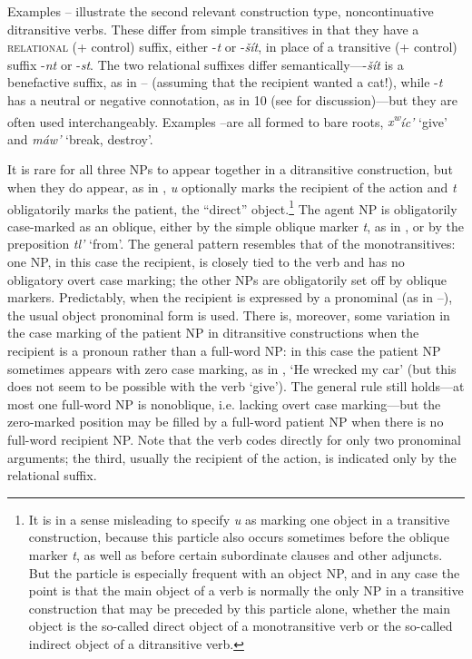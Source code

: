 \documentclass[output=paper,colorlinks,citecolor=brown]{langscibook}
\begin{document}
Examples -- illustrate the second relevant construction type,
noncontinuative ditransitive verbs.  These differ from simple
transitives in that they have a \textsc{relational} (+ control) suffix,
either -\emph{{\textltilde}t} or -\emph{\v{s}\'it}, in place of a
transitive (+ control) suffix -\emph{nt} or -\emph{st}.  The two
relational suffixes differ semantically----\emph{\v{s}\'it} is a
benefactive suffix, as in -- (assuming that the recipient wanted a
cat!), while -\emph{{\textltilde}t} has a neutral or negative
connotation, as in 10 (see \citealt{Carlson:1980} for discussion)---but they
are often used interchangeably.  Examples --are all formed to bare
roots, \emph{{x\textsuperscript w}\'ic'} `give' and \emph{m\'aw'}
`break, destroy'.


  It is rare for all three NPs to appear together in a ditransitive
  construction, but when they do appear, as in , \emph{{\textltilde}u} optionally marks the recipient of the action and
  \emph{t} obligatorily marks the patient, the ``direct''
  object.\footnote{It is in a sense misleading to specify \emph{{\textltilde}u} as marking one object in a transitive
  construction, because this particle also occurs sometimes before
  the oblique marker \emph{t}, as well as before certain subordinate
  clauses and other adjuncts.  But the particle is especially
  frequent with an object NP, and in any case the point is that the
  main object of a verb is normally the only NP in a transitive
  construction that may be preceded by this particle alone, whether
  the main object is the so-called direct object of a monotransitive
  verb or the so-called indirect object of a ditransitive verb.  }
  The agent NP is obligatorily case-marked as an oblique, either by
  the simple oblique marker \emph{t}, as in , or by the preposition
  \emph{tl'} `from'.  The general pattern resembles that of the
  monotransitives: one NP, in this case the recipient, is closely
  tied to the verb and has no obligatory overt case marking; the
  other NPs are obligatorily set off by oblique markers.
  Predictably, when the recipient is expressed by a pronominal (as in
  --), the usual object pronominal form is used.  There is,
  moreover, some variation in the case marking of the patient NP in
  ditransitive constructions when the recipient is a pronoun rather
  than a full-word NP: in this case the patient NP sometimes appears
  with zero case marking, as in , `He wrecked my car' (but this
  does not seem to be possible with the verb `give').  The general
  rule still holds---at most one full-word NP is nonoblique, i.e.
  lacking overt case marking---but the zero-marked position may be
  filled by a full-word patient NP when there is no full-word
  recipient NP.  Note that the verb codes directly for only two
  pronominal arguments; the third, usually the recipient of the
  action, is indicated only by the relational suffix.
\end{document}
